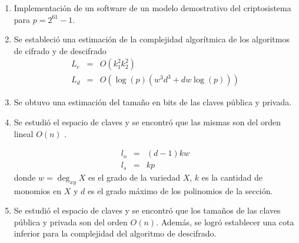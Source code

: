 \documentclass[12pt]{article}
\begin{document}
\begin{enumerate}
\item Implementaci\'on de un software de un modelo demostrativo del criptosistema para $p = 2^{61}-1$.  

\item Se estableci\'o una estimaci\'on de la complejidad algor\'itmica de los algoritmos de cifrado y de descifrado
\begin{eqnarray*}
L_e &=&O(k_1^2 k_2^2)\\
L_d &=& O(\log (p)(w^3 d^3 + dw \log(p)))
\end{eqnarray*}

\item Se obtuvo una estimaci\'on del tama\~no en bits de las claves p\'ublica y privada.
\item Se estudi\'o el espacio de claves y se encontr\'o que las mismas son del orden lineal  $O(n)$ .

\begin{eqnarray*}
l_o &=& (d-1)kw \\
l_s&=& kp
\end{eqnarray*}
donde $w = \deg_{xy} X$ es el grado de la variedad $X$, $k$ es la cantidad de monomios en $X$ y $d$ es el grado m\'aximo de los polinomios de la secci\'on.

\item Se estudi\'o el espacio de claves y se encontr\'o que los tama\~nos de las claves p\'ublica y privada son del orden $O(n)$. Adem\'as, se logr\'o establecer una cota inferior para la complejidad del algoritmo de descifrado.
\end{enumerate}


\end{document}
